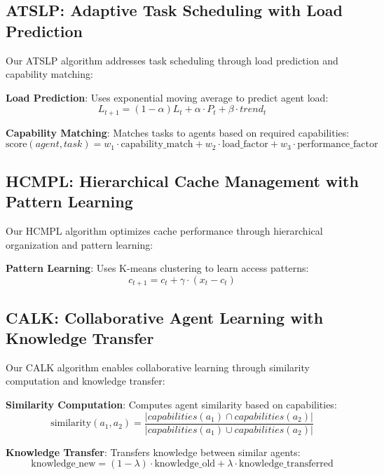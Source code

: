 \documentclass[conference]{IEEEtran}
\begin{document}
\subsection{ATSLP: Adaptive Task Scheduling with Load Prediction}

Our ATSLP algorithm addresses task scheduling through load prediction and capability matching:

\textbf{Load Prediction}: Uses exponential moving average to predict agent load:
\begin{equation}
L_{t+1} = (1-\alpha)L_t + \alpha \cdot P_t + \beta \cdot trend_t
\end{equation}

\textbf{Capability Matching}: Matches tasks to agents based on required capabilities:
\begin{equation}
\text{score}(agent, task) = w_1 \cdot \text{capability\_match} + w_2 \cdot \text{load\_factor} + w_3 \cdot \text{performance\_factor}
\end{equation}

\subsection{HCMPL: Hierarchical Cache Management with Pattern Learning}

Our HCMPL algorithm optimizes cache performance through hierarchical organization and pattern learning:

\textbf{Pattern Learning}: Uses K-means clustering to learn access patterns:
\begin{equation}
c_{t+1} = c_t + \gamma \cdot (x_t - c_t)
\end{equation}

\subsection{CALK: Collaborative Agent Learning with Knowledge Transfer}

Our CALK algorithm enables collaborative learning through similarity computation and knowledge transfer:

\textbf{Similarity Computation}: Computes agent similarity based on capabilities:
\begin{equation}
\text{similarity}(a_1, a_2) = \frac{|capabilities(a_1) \cap capabilities(a_2)|}{|capabilities(a_1) \cup capabilities(a_2)|}
\end{equation}

\textbf{Knowledge Transfer}: Transfers knowledge between similar agents:
\begin{equation}
\text{knowledge\_new} = (1-\lambda) \cdot \text{knowledge\_old} + \lambda \cdot \text{knowledge\_transferred}
\end{equation}
\end{document}
